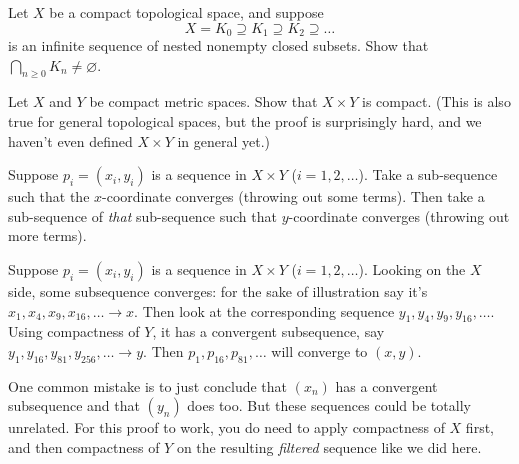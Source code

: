 \begin{problem}
	\label{prob:cantor_intersect}
	Let $X$ be a compact topological space, and suppose
	\[ X = K_0 \supseteq K_1 \supseteq K_2 \supseteq \dots \]
	is an infinite sequence of nested nonempty closed subsets.
	Show that $\bigcap_{n \ge 0} K_n \neq \varnothing$.
\end{problem}


\begin{problem}
	Let $X$ and $Y$ be compact metric spaces. Show that $X \times Y$ is compact.
	(This is also true for general topological spaces,
	but the proof is surprisingly hard,
	and we haven't even defined $X \times Y$ in general yet.)
	\label{prob:tychonoff}
	\begin{hint}
	Suppose $p_i = (x_i, y_i)$ is a sequence in $X \times Y$ ($i=1,2,\dots$).
	Take a sub-sequence such that the $x$-coordinate converges
	(throwing out some terms).
	Then take a sub-sequence of \emph{that} sub-sequence
	such that $y$-coordinate converges (throwing out more terms).
	\end{hint}
	\begin{sol}
	Suppose $p_i = (x_i, y_i)$ is a sequence in $X \times Y$ ($i=1,2,\dots$).
	Looking on the $X$ side, some subsequence converges:
	for the sake of illustration say it's $x_1, x_4, x_9, x_{16}, \dots \to x$.
	Then look at the corresponding sequence $y_1, y_4, y_9, y_{16}, \dots$.
	Using compactness of $Y$, it has a convergent subsequence, say
	$y_1, y_{16}, y_{81}, y_{256}, \dots \to y$.
	Then $p_1, p_{16}, p_{81}, \dots$ will converge to $(x,y)$.

	One common mistake is to just conclude
	that $(x_n)$ has a convergent subsequence
	and that $(y_n)$ does too.
	But these sequences could be totally unrelated.
	For this proof to work,
	you do need to apply compactness of $X$ first,
	and then compactness of $Y$ on the resulting \emph{filtered}
	sequence like we did here.
	\end{sol}
\end{problem}

